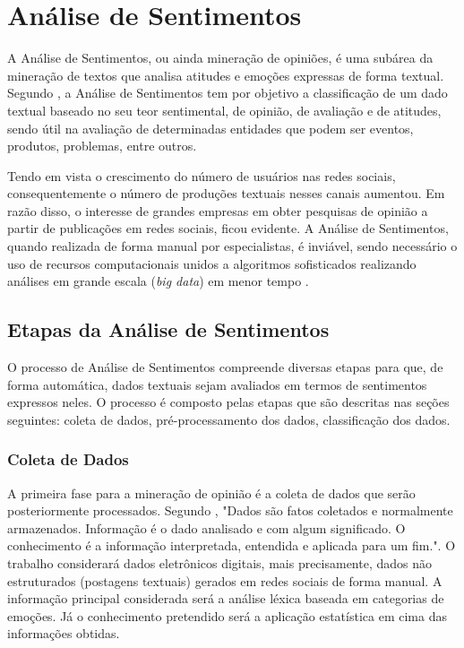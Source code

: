 \chapter{Análise de Sentimentos}
\label{cap:REFERENCIAL}

A Análise de Sentimentos, ou ainda mineração de opiniões, é uma subárea da mineração de textos que analisa atitudes e emoções expressas de forma textual. Segundo , a Análise de Sentimentos tem por objetivo a classificação de um dado textual baseado no seu teor sentimental, de opinião, de avaliação e de atitudes, sendo útil na avaliação de determinadas entidades que podem ser eventos, produtos, problemas, entre outros. 

Tendo em vista o crescimento do número de usuários nas redes sociais, consequentemente o número de produções textuais nesses canais aumentou. Em razão disso, o interesse de grandes empresas em obter pesquisas de opinião a partir de publicações em redes sociais, ficou evidente. A Análise de Sentimentos, quando realizada de forma manual por especialistas, é inviável, sendo necessário o uso de recursos computacionais unidos a algoritmos sofisticados realizando análises em grande escala (\textit{big data}) em menor tempo \cite{BAHRI2018669}.

\section{Etapas da Análise de Sentimentos}

O processo de Análise de Sentimentos compreende diversas etapas para que, de forma automática, dados textuais sejam avaliados em termos de sentimentos expressos neles. O processo é composto pelas etapas que são descritas nas seções seguintes: coleta de dados, pré-processamento dos dados, classificação dos dados.  

\subsection{Coleta de Dados}
\label{subsec:coletadados}
A primeira fase para a mineração de opinião é a coleta de dados que serão posteriormente processados. Segundo , "Dados são fatos coletados e normalmente armazenados. Informação é o dado analisado e com algum significado. O conhecimento é a informação interpretada, entendida e aplicada para um fim.". O trabalho considerará dados eletrônicos digitais, mais precisamente, dados não estruturados (postagens textuais) gerados em redes sociais de forma manual. A informação principal considerada será a análise léxica baseada em categorias de emoções. Já o conhecimento pretendido será a aplicação estatística em cima das informações obtidas.

